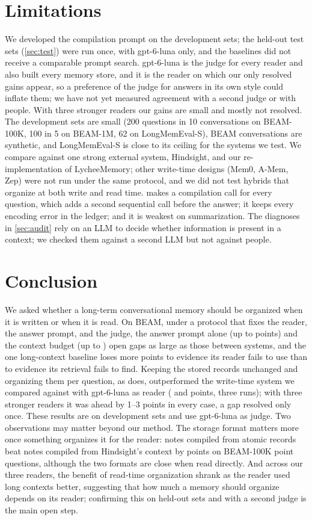 \section{Limitations}
\label{sec:limits}
We developed the compilation prompt on the development sets; the held-out test sets (\cref{sec:test}) were run once,
with gpt-6-luna only, and the baselines did not receive a comparable prompt search. gpt-6-luna is the
judge for every reader and also built every memory store, and it is the reader on which our only resolved gains appear,
so a preference of the judge for answers in its own style could inflate them; we have not yet measured agreement with
a second judge or with people. With three stronger readers our gains are small and mostly not resolved. The
development sets are small (200 questions in 10 conversations on BEAM-100K, 100 in 5 on BEAM-1M, 62 on
LongMemEval-S), BEAM conversations are synthetic, and LongMemEval-S is close to its ceiling for the systems we test. We
compare against one strong external system, Hindsight, and our re-implementation of LycheeMemory; other write-time
designs (Mem0, A-Mem, Zep) were not run under the same protocol, and we did not test hybrids that organize at both
write and read time. \method{} makes a compilation call for every question, which adds a second sequential call before the answer; it keeps every encoding error in the ledger; and it is weakest on summarization. The diagnoses in
\cref{sec:audit} rely on an LLM to decide whether information is present in a context; we checked them
against a second LLM but not against people.

\section{Conclusion}
\label{sec:conclusion}
We asked whether a long-term conversational memory should be organized when it is written or when it is read. On BEAM,
under a protocol that fixes the reader, the answer prompt, and the judge, the answer prompt alone (up to 
points) and the context budget (up to ) open gaps as large as those between systems, and the one
long-context baseline loses more points to evidence its reader fails to use than to evidence its retrieval fails to
find. Keeping the stored records unchanged and organizing them per question, as \method{} does, outperformed the
write-time system we compared against with gpt-6-luna as reader ( and  points, three runs);
with three stronger readers it was ahead by 1--3 points in every case, a gap resolved only once. These
results are on development sets and use gpt-6-luna as judge. Two observations may matter beyond our method. The
storage format matters more once something organizes it for the reader: notes compiled from atomic records beat
notes compiled from Hindsight's context by  points on BEAM-100K point questions, although the two formats
are close when read directly. And across our three readers, the benefit of read-time organization shrank as the reader used long contexts better, suggesting that how much a memory should organize depends on its reader; confirming this on held-out sets and with a second judge is the main open step.
